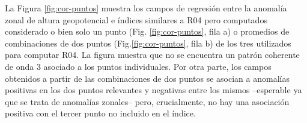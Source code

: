 \documentclass[12pt,oneside,a4paper]{reedthesis}
\begin{document}
La Figura \ref{fig:cor-puntos} muestra los campos de regresión entre la anomalía zonal de altura geopotencial e índices similares a R04 pero computados considerado o bien solo un punto (Fig. \ref{fig:cor-puntos}, fila a) o promedios de combinaciones de dos puntos (Fig.\ref{fig:cor-puntos}, fila b) de los tres utilizados para computar R04.
La figura muestra que no se encuentra un patrón coherente de onda 3 asociado a los puntos individuales.
Por otra parte, los campos obtenidos a partir de las combinaciones de dos puntos se asocian a anomalías positivas en los dos puntos relevantes y negativas entre los mismos --esperable ya que se trata de anomalías zonales-- pero, crucialmente, no hay una asociación positiva con el tercer punto no incluido en el índice.

\begin{figure}

{\centering {}\newline{}

}
\end{figure}
\end{document}
